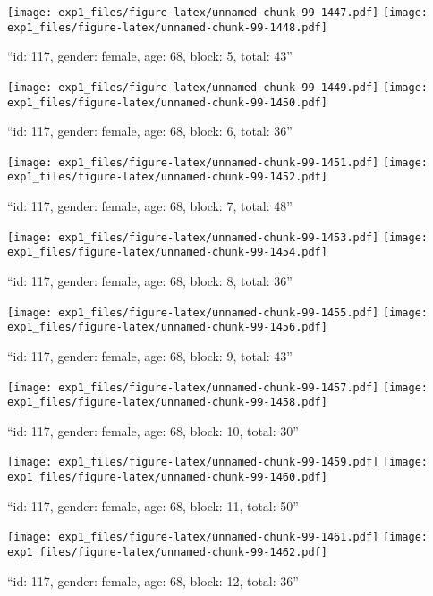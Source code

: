 \documentclass[,]{article}
\begin{document}
\texttt{[image: exp1\_files/figure-latex/unnamed-chunk-99-1447.pdf]}
\texttt{[image: exp1\_files/figure-latex/unnamed-chunk-99-1448.pdf]}

\newpage
[1] 

``id: 117, gender: female, age: 68, block: 5, total: 43''

\texttt{[image: exp1\_files/figure-latex/unnamed-chunk-99-1449.pdf]}
\texttt{[image: exp1\_files/figure-latex/unnamed-chunk-99-1450.pdf]}

\newpage
[1] 

``id: 117, gender: female, age: 68, block: 6, total: 36''

\texttt{[image: exp1\_files/figure-latex/unnamed-chunk-99-1451.pdf]}
\texttt{[image: exp1\_files/figure-latex/unnamed-chunk-99-1452.pdf]}

\newpage
[1] 

``id: 117, gender: female, age: 68, block: 7, total: 48''

\texttt{[image: exp1\_files/figure-latex/unnamed-chunk-99-1453.pdf]}
\texttt{[image: exp1\_files/figure-latex/unnamed-chunk-99-1454.pdf]}

\newpage
[1] 

``id: 117, gender: female, age: 68, block: 8, total: 36''

\texttt{[image: exp1\_files/figure-latex/unnamed-chunk-99-1455.pdf]}
\texttt{[image: exp1\_files/figure-latex/unnamed-chunk-99-1456.pdf]}

\newpage
[1] 

``id: 117, gender: female, age: 68, block: 9, total: 43''

\texttt{[image: exp1\_files/figure-latex/unnamed-chunk-99-1457.pdf]}
\texttt{[image: exp1\_files/figure-latex/unnamed-chunk-99-1458.pdf]}

\newpage
[1] 

``id: 117, gender: female, age: 68, block: 10, total: 30''

\texttt{[image: exp1\_files/figure-latex/unnamed-chunk-99-1459.pdf]}
\texttt{[image: exp1\_files/figure-latex/unnamed-chunk-99-1460.pdf]}

\newpage
[1] 

``id: 117, gender: female, age: 68, block: 11, total: 50''

\texttt{[image: exp1\_files/figure-latex/unnamed-chunk-99-1461.pdf]}
\texttt{[image: exp1\_files/figure-latex/unnamed-chunk-99-1462.pdf]}

\newpage
[1] 

``id: 117, gender: female, age: 68, block: 12, total: 36''
\end{document}
